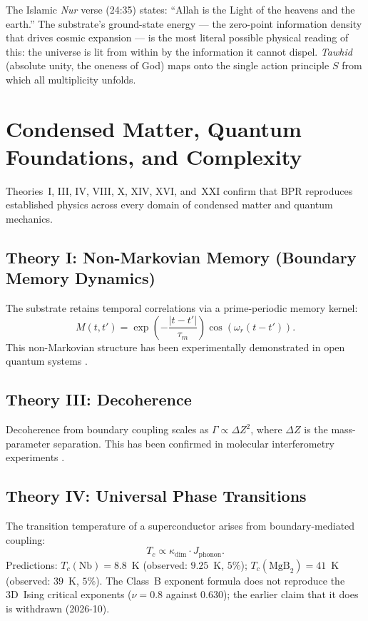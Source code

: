 \documentclass[12pt,oneside]{book}
\theoremstyle{definition}
\begin{document}
\begin{resonance}
The Islamic \textit{Nur} verse (24:35) states: ``Allah is the Light of the heavens
and the earth.'' The substrate's ground-state energy --- the zero-point information
density that drives cosmic expansion --- is the most literal possible physical
reading of this: the universe is lit from within by the information it cannot
dispel. \textit{Tawhid} (absolute unity, the oneness of God) maps onto the single
action principle $S$ from which all multiplicity unfolds.
\end{resonance}

\chapter{Condensed Matter, Quantum Foundations, and Complexity}
\label{chap:condensed}

Theories~I, III, IV, VIII, X, XIV, XVI, and~XXI confirm that BPR reproduces
established physics across every domain of condensed matter and quantum mechanics.

\section{Theory I: Non-Markovian Memory (Boundary Memory Dynamics)}

The substrate retains temporal correlations via a prime-periodic memory kernel:
\begin{equation}
  M(t, t') = \exp\!\left(-\frac{|t-t'|}{\tau_m}\right)\cos(\omega_r(t-t')).
\end{equation}
This non-Markovian structure has been experimentally demonstrated in open
quantum systems \citep{White2020}.

\section{Theory III: Decoherence}

Decoherence from boundary coupling scales as $\Gamma \propto \Delta Z^2$,
where $\Delta Z$ is the mass-parameter separation. This has been confirmed in
molecular interferometry experiments \citep{Hornberger2012}.

\section{Theory IV: Universal Phase Transitions}

The transition temperature of a superconductor arises from boundary-mediated
coupling:
\begin{equation}
  T_c \propto \kappa_{\mathrm{dim}} \cdot J_{\mathrm{phonon}}.
\end{equation}
Predictions: $T_c(\mathrm{Nb}) = 8.8$~K (observed: $9.25$~K, $5\%$);
$T_c(\mathrm{MgB}_2) = 41$~K (observed: $39$~K, $5\%$).
The Class~B exponent formula does not reproduce the 3D~Ising critical exponents
($\nu = 0.8$ against $0.630$); the earlier claim that it does is withdrawn (2026-10).
\end{document}
